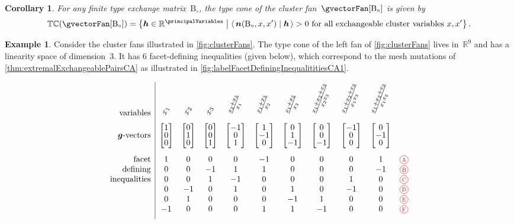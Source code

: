 \documentclass{amsart}
\newtheorem{corollary}[theorem]{Corollary}
\theoremstyle{definition}
\newtheorem{example}[theorem]{Example}
\newcommand{\R}{\mathbb{R}} %
\renewcommand{\b}[1]{{\boldsymbol{#1}}} %
\newcommand{\set}[2]{\left\{ #1 \;\middle|\; #2 \right\}} %
\newcommand{\dotprod}[2]{\left\langle \, #1 \; \middle| \; #2 \, \right\rangle} %
\newcommand{\red}{\color{red}} %
\newcommand*\circled[1]{\tikz[baseline=(char.base)]{\node[shape=circle, draw, inner sep=1.5pt, scale=.7] (char) {#1};}}
\newcommand{\compactVectorT}[3]{\begin{bmatrix} #1 \\[-.1cm] #2 \\[-.1cm] #3 \end{bmatrix}}
\newcommand{\typeCone}{\mathbb{TC}} %
\newcommand{\B}{\mathrm{B}} %
\begin{document}
\begin{corollary}
\label{coro:typeConeCA}
For any finite type exchange matrix~$\B_\circ$, the type cone of the cluster fan~$\gvectorFan[\B_\circ]$ is given by
\[
\typeCone(\gvectorFan[\B_\circ]) = \set{\b{h} \in \R^{\principalVariables}}{\dotprod{\b{n}(\B_\circ, x, x')}{\b{h}} > 0 \text{ for all exchangeable cluster variables } x, x'}.
\]
\end{corollary}

\begin{example}
\label{exm:typeConeCA}
Consider the cluster fans illustrated in \cref{fig:clusterFans}.
The type cone of the left fan of \cref{fig:clusterFans} lives in~$\R^9$ and has a linearity space of dimension~$3$.
It has $6$ facet-defining inequalities (given below), which correspond to the mesh mutations of \cref{thm:extremalExchangeablePairsCA} as illustrated in \cref{fig:labelFacetDefiningInequalititiesCA1}.

\[
\begin{array}{r|cccccccccc}
\text{variables} & \rotatebox{70}{$x_1$} & \rotatebox{70}{$x_2$} & \rotatebox{70}{$x_3$} & \rotatebox{70}{$\frac{x_2 + x_3}{x_1}$} & \rotatebox{70}{$\frac{x_1 + x_3}{x_2}$} & \rotatebox{70}{$\frac{x_1 + x_2}{x_3}$} & \rotatebox{70}{$\frac{x_1 + x_2 + x_3}{x_2 x_3}$} & \rotatebox{70}{$\frac{x_1 + x_2 + x_3}{x_1 x_3}$} & \rotatebox{70}{$\frac{x_1 + x_2 + x_3}{x_1 x_2}$} \\[.2cm]
\text{$\b{g}$-vectors} & \compactVectorT{1}{0}{0} & \compactVectorT{0}{1}{0} & \compactVectorT{0}{0}{1} & \compactVectorT{-1}{0}{1} & \compactVectorT{1}{-1}{0} & \compactVectorT{0}{1}{-1} & \compactVectorT{0}{0}{-1} & \compactVectorT{-1}{0}{0} & \compactVectorT{0}{-1}{0} \\[.6cm]
\text{facet} 		& 1 & 0 & 0 & 0 & -1 & 0 & 0 & 0 & 1 & \red \circled{A} \\
\text{defining}		& 0 & 0 & -1 & 1 & 1 & 0 & 0 & 0 & -1 & \red \circled{B} \\
\text{inequalities}	& 0 & 0 & 1 & -1 & 0 & 0 & 0 & 1 & 0 & \red \circled{C} \\
 					& 0 & -1 & 0 & 1 & 0 & 1 & 0 & -1 & 0 & \red \circled{D} \\
 					& 0 & 1 & 0 & 0 & 0 & -1 & 1 & 0 & 0 & \red \circled{E} \\
					& -1 & 0 & 0 & 0 & 1 & 1 & -1 & 0 & 0 & \red \circled{F} \\[.2cm]
\end{array}
\]



\end{example}
\end{document}

